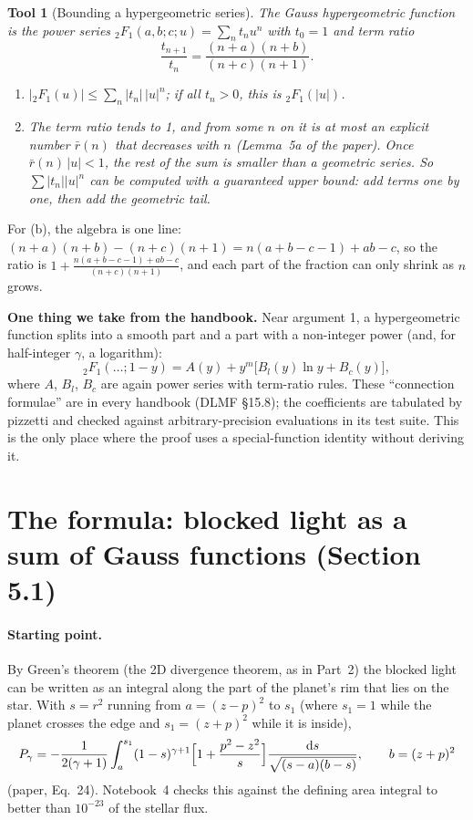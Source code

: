 \documentclass[11pt,a4paper]{article}
\newtheorem{tool}{Tool}
\theoremstyle{remark}
\newcommand{\dd}{\mathrm{d}}
\begin{document}
\begin{tool}[Bounding a hypergeometric series]
The Gauss hypergeometric function is the power series ${}_2F_1(a,b;c;u)=\sum_nt_nu^n$ with $t_0=1$
and term ratio
\[
  \frac{t_{n+1}}{t_n}=\frac{(n+a)(n+b)}{(n+c)(n+1)} .
\]
\begin{enumerate}
  \item[(a)] $|{}_2F_1(u)|\le\sum_n|t_n|\,|u|^n$; if all $t_n>0$, this is ${}_2F_1(|u|)$.
  \item[(b)] The term ratio tends to 1, and from some $n$ on it is at most an explicit number
        $\bar r(n)$ that decreases with $n$ (Lemma~5a of the paper). Once $\bar r(n)\,|u|<1$, the
        rest of the sum is smaller than a geometric series. So $\sum|t_n||u|^n$ can be computed
        with a guaranteed upper bound: add terms one by one, then add the geometric tail.
\end{enumerate}
\end{tool}
For (b), the algebra is one line: $(n+a)(n+b)-(n+c)(n+1)=n(a+b-c-1)+ab-c$, so the ratio is
$1+\frac{n(a+b-c-1)+ab-c}{(n+c)(n+1)}$, and each part of the fraction can only shrink as $n$ grows.

\medskip\noindent\textbf{One thing we take from the handbook.} Near argument 1, a hypergeometric
function splits into a smooth part and a part with a non-integer power (and, for half-integer
$\gamma$, a logarithm):
\[
  {}_2F_1(\dots;1-y)=A(y)+y^{m}\bigl[B_l(y)\ln y+B_c(y)\bigr],
\]
where $A$, $B_l$, $B_c$ are again power series with term-ratio rules. These ``connection formulae''
are in every handbook (DLMF \S15.8); the coefficients are tabulated by pizzetti and checked against
arbitrary-precision evaluations in its test suite. This is the only place where the proof uses a
special-function identity without deriving it.

\section{The formula: blocked light as a sum of Gauss functions (Section 5.1)}

\paragraph{Starting point.} By Green's theorem (the 2D divergence theorem, as in Part~2) the blocked
light can be written as an integral along the part of the planet's rim that lies on the star. With
$s=r^2$ running from $a=(z-p)^2$ to $s_1$ (where $s_1=1$ while the planet crosses the edge and
$s_1=(z+p)^2$ while it is inside),
\[
  P_\gamma=-\frac{1}{2(\gamma+1)}\int_a^{s_1}(1-s)^{\gamma+1}\Bigl[1+\frac{p^2-z^2}{s}\Bigr]
  \frac{\dd s}{\sqrt{(s-a)(b-s)}},\qquad b=(z+p)^2
\]
(paper, Eq.~24). Notebook~4 checks this against the defining area integral to better than $10^{-23}$ of the stellar flux.
\end{document}
